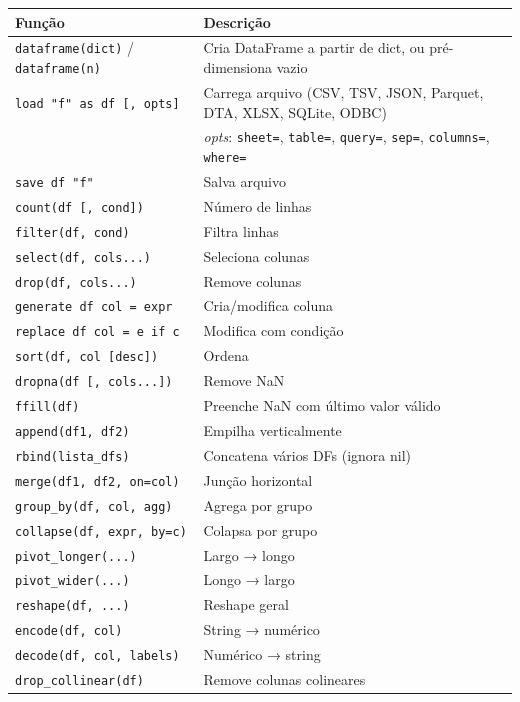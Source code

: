 \begin{center}
\begin{tabular}{ll}
\toprule
\textbf{Função} & \textbf{Descrição} \\
\midrule
\texttt{dataframe(dict)} / \texttt{dataframe(n)} & Cria DataFrame a partir de dict, ou pré-dimensiona vazio \\
\texttt{load "f" as df [, opts]}  & Carrega arquivo (CSV, TSV, JSON, Parquet, DTA, XLSX, SQLite, ODBC) \\
                                  & \quad \textit{opts}: \texttt{sheet=}, \texttt{table=}, \texttt{query=}, \texttt{sep=}, \texttt{columns=}, \texttt{where=} \\
\texttt{save df "f"}              & Salva arquivo \\
\texttt{count(df [, cond])}       & Número de linhas \\
\texttt{filter(df, cond)}         & Filtra linhas \\
\texttt{select(df, cols...)}      & Seleciona colunas \\
\texttt{drop(df, cols...)}        & Remove colunas \\
\texttt{generate df col = expr}   & Cria/modifica coluna \\
\texttt{replace df col = e if c}  & Modifica com condição \\
\texttt{sort(df, col [desc])}     & Ordena \\
\texttt{dropna(df [, cols...])}   & Remove NaN \\
\texttt{ffill(df)}                & Preenche NaN com último valor válido \\
\texttt{append(df1, df2)}         & Empilha verticalmente \\
\texttt{rbind(lista\_dfs)}        & Concatena vários DFs (ignora nil) \\
\texttt{merge(df1, df2, on=col)}  & Junção horizontal \\
\texttt{group\_by(df, col, agg)}  & Agrega por grupo \\
\texttt{collapse(df, expr, by=c)} & Colapsa por grupo \\
\texttt{pivot\_longer(...)}       & Largo → longo \\
\texttt{pivot\_wider(...)}        & Longo → largo \\
\texttt{reshape(df, ...)}         & Reshape geral \\
\texttt{encode(df, col)}          & String → numérico \\
\texttt{decode(df, col, labels)}  & Numérico → string \\
\texttt{drop\_collinear(df)}       & Remove colunas colineares \\
\bottomrule
\end{tabular}
\end{center}

